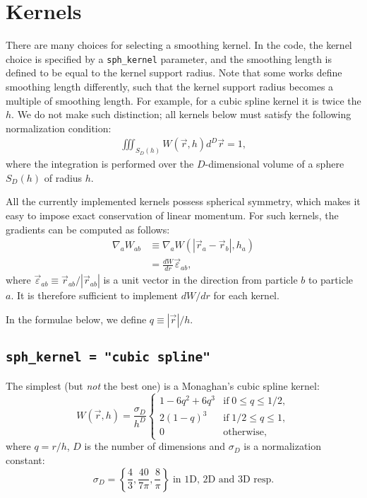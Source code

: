 \documentclass[notes.tex]{subfiles}
\begin{document}
\section{Kernels}
\label{sec:kernels}
There are many choices for selecting a smoothing kernel. In the code, the
kernel choice is specified by a {\tt sph\_kernel} parameter, and the smoothing
length is defined to be equal to the kernel support radius. Note that some
works define smoothing length differently, such that the kernel support radius
becomes a multiple of smoothing length. For example, for a cubic spline kernel
it is twice the $h$. We do not make such distinction; all kernels below must
satisfy the following normalization condition:
\begin{align}
  \iiint_{S_D(h)} W(\vec{r},h) d^D\vec{r} = 1,
\label{eq:kernel_normalization_condition}
\end{align}
where the integration is performed over the $D$-dimensional volume of a sphere
$S_D(h)$ of radius $h$.

All the currently implemented kernels possess spherical symmetry, which makes
it easy to impose exact conservation of linear momentum. For such kernels, the
gradients can be computed as follows:
\begin{align}
  \nabla_a W_{ab} &\equiv \nabla_a W(|\vec{r}_a - \vec{r}_b|, h_a) \\
                  &= \frac{dW}{dr} \vec{\varepsilon}_{ab},
\end{align}
where $\vec{\varepsilon}_{ab}\equiv\vec{r}_{ab}/|\vec{r}_{ab}|$ is a unit
vector in the direction from particle $b$ to particle $a$.
It is therefore sufficient to implement $dW/dr$ for each kernel.

In the formulae below, we define $q\equiv|\vec{r}|/h$.

\subsection{{\tt sph\_kernel = "cubic spline"}}
The simplest (but \emph{not} the best one) is a Monaghan's cubic spline kernel:
\begin{equation}
W(\vec{r},h) = \frac{\sigma_D}{h^D} 
  \begin{cases}
    1 - 6 q^2 + 6 q^3 & \text{if} \; 0 \leq q \leq 1/2, \\
    2(1 - q)^3        & \text{if} \; 1/2 \leq q \leq 1, \\
    0                 & \text{otherwise},
\end{cases}
\end{equation}
where $q = r/h$, $D$ is the number of dimensions and 
$\sigma_D$ is a normalization constant:
\begin{equation}
\sigma_D =  \left\{ \frac43, \frac{40}{7\pi},\frac8{\pi}\right\}
         \; \text{in 1D, 2D and 3D resp.}
\end{equation}
\end{document}
